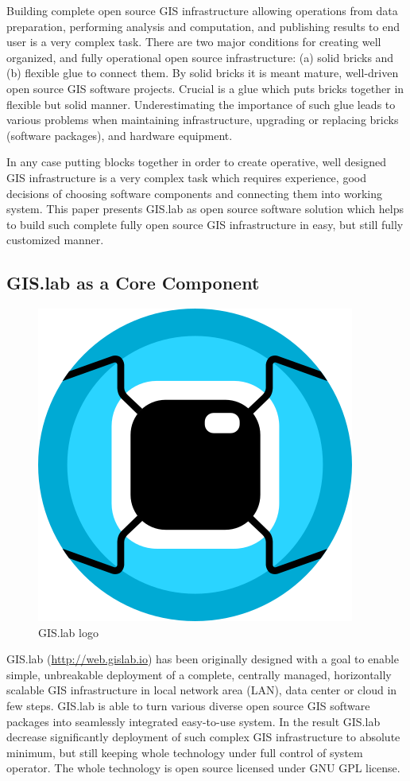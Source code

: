 \documentclass{isprs}
\begin{document}
Building complete open source GIS infrastructure allowing operations
from data preparation, performing analysis and computation, and
publishing results to end user is a very complex task. There are two
major conditions for creating well organized, and fully operational
open source infrastructure: (a) solid bricks and (b) flexible glue to
connect them. By solid bricks it is meant mature, well-driven open
source GIS software projects. Crucial is a glue which puts bricks
together in flexible but solid manner. Underestimating the importance
of such glue leads to various problems when maintaining
infrastructure, upgrading or replacing bricks (software packages), and
hardware equipment.

In any case putting blocks together in order to create operative, well
designed GIS infrastructure is a very complex task which requires
experience, good decisions of choosing software components and
connecting them into working system. This paper presents GIS.lab as
open source software solution which helps to build such complete fully
open source GIS infrastructure in easy, but still fully customized
manner.

\subsection{GIS.lab as a Core Component}

\begin{figure}[ht!]
\begin{center}
  \includegraphics[width=.25\columnwidth]{figures/gislab-logo.png}
  \caption{GIS.lab logo}
\label{fig:gislab_logo}
\end{center}
\end{figure}

GIS.lab (\url{http://web.gislab.io}) has been originally designed with
a goal to enable simple, unbreakable deployment of a complete,
centrally managed, horizontally scalable GIS infrastructure in local
network area (LAN), data center or cloud in few steps. GIS.lab is
able to turn various diverse open source GIS software packages into
seamlessly integrated easy-to-use system. In the result GIS.lab
decrease significantly deployment of such complex GIS infrastructure to
absolute minimum, but still keeping whole technology under full
control of system operator. The whole technology is open source
licensed under GNU GPL license.
\end{document}

